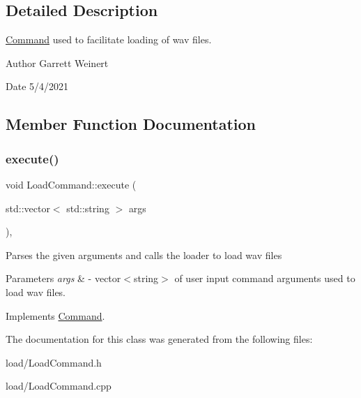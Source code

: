 \subsection{Detailed Description}
\hyperlink{classCommand}{Command} used to facilitate loading of wav files. \begin{DoxyAuthor}{Author}
Garrett Weinert 
\end{DoxyAuthor}
\begin{DoxyDate}{Date}
5/4/2021 
\end{DoxyDate}


\subsection{Member Function Documentation}
\mbox{\label{classLoadCommand_a3e6c8b95c046e19dfd8e792876e28c50}} 
\subsubsection{\texorpdfstring{execute()}{execute()}}
{\footnotesize\ttfamily void Load\+Command\+::execute (\begin{DoxyParamCaption}\item[{std\+::vector$<$ std\+::string $>$}]{args }\end{DoxyParamCaption})\hspace{0.3cm}{\ttfamily [override]}, {\ttfamily [virtual]}}

Parses the given arguments and calls the loader to load wav files 
\begin{DoxyParams}{Parameters}
{\em args} & -\/ vector$<$string$>$ of user input command arguments used to load wav files. \\
\hline
\end{DoxyParams}


Implements \hyperlink{classCommand}{Command}.



The documentation for this class was generated from the following files\+:\begin{DoxyCompactItemize}
\item 
load/Load\+Command.\+h\item 
load/Load\+Command.\+cpp\end{DoxyCompactItemize}
